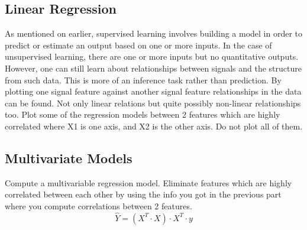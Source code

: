 \documentclass[]{article}
\begin{document}
\subsection{Linear Regression}
As mentioned on earlier, supervised learning involves building a model in order to predict or estimate an output based on one or more inputs. In the case of unsupervised learning, there are one or more inputs but no quantitative outputs. However, one can still learn about relationships between signals and the structure from such data. This is more of an inference task rather than prediction.
By plotting one signal feature against another signal feature relationships in the data can be found. Not only linear relations but quite possibly non-linear relationships too.
Plot some of the regression models between 2 features which are highly correlated where X1 is one axis, and X2 is the other axis. Do not plot all of them.
\subsection{Multivariate Models}
Compute a multivariable regression model.
Eliminate features which are highly correlated between each other by using the info you got in the previous part where you compute correlations between 2 features.
$$ \hat{Y} = (X^T \cdot X) \cdot X^T \cdot y $$
\end{document}
